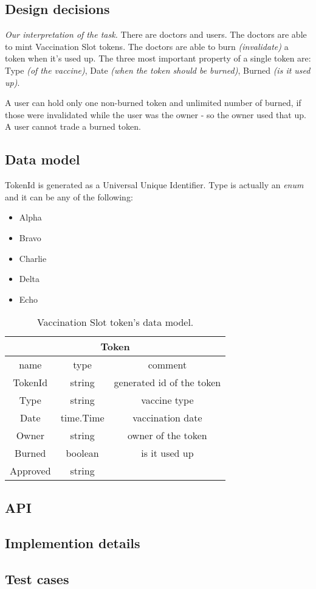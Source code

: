 \subsection{Design decisions}
\emph{Our interpretation of the task.} There are doctors and users. The doctors are able to mint Vaccination Slot tokens. The doctors are able to burn \emph{(invalidate)} a token when it's used up. The three most important property of a single token are: Type \emph{(of the vaccine)}, Date \emph{(when the token should be burned)}, Burned \emph{(is it used up)}.

A user can hold only one non-burned token and unlimited number of burned, if those were invalidated while the user was the owner - so the owner used that up. A user cannot trade a burned token.


\subsection{Data model}
TokenId is generated as a Universal Unique Identifier. Type is actually an \emph{enum} and it can be any of the following:
\begin{itemize}
  \item Alpha
  \item Bravo
  \item Charlie
  \item Delta
  \item Echo
\end{itemize}

\begin{center}
  \begin{table}[h!]
    \centering
    \begin{tabular}{|c | c | c |}
      \hline
      \multicolumn{3}{|c|}{Token}                      \\
      \hline
      name     & type      & comment                   \\
      \hline
      TokenId  & string    & generated id of the token \\
      Type     & string    & vaccine type              \\
      Date     & time.Time & vaccination date          \\
      Owner    & string    & owner of the token        \\
      Burned   & boolean   & is it used up             \\
      Approved & string    &                           \\
      \hline
    \end{tabular}
    \caption{Vaccination Slot token's data model.}
  \end{table}
\end{center}
\subsection{API}

\subsection{Implemention details}

\subsection{Test cases}